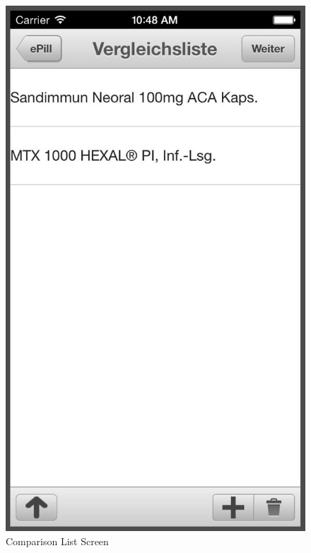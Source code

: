 \begin{figure}[ptb]
\begin{minipage}[b]{0.45\linewidth}
        \includegraphics[width=0.8025\linewidth]{figures/List_bw.jpg}
        \caption[Comparison List Screen]{Comparison List Screen}
        \label{fig:CurrentListScreen}
    \end{minipage}
    \hspace{0.5cm}
    \begin{minipage}[b]{0.45\linewidth}
        \centering

\end{minipage}
\end{figure}
